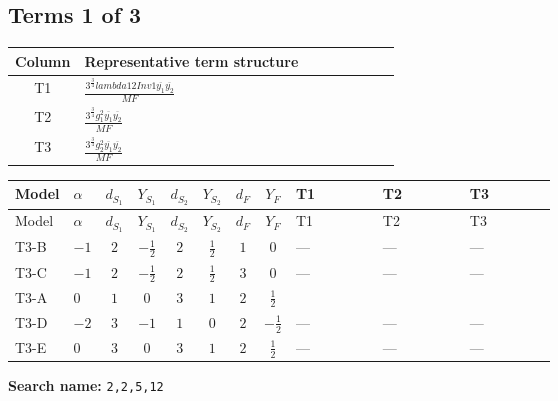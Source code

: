 \documentclass[8pt]{article}
\begin{document}
\begin{landscape}
\subsection*{Terms 1 of 3}
\begin{center}
\begin{tabular}{@{}c >{\raggedright\arraybackslash}p{0.82\linewidth}@{}}
\toprule
Column & Representative term structure \\
\midrule
T1 & \(\displaystyle \frac{3^{\frac{3}{4}} lambda12Inv1 \overline{y_{1}} \overline{y_{2}}}{MF}\) \\
\midrule
T2 & \(\displaystyle \frac{3^{\frac{3}{4}} g_{1}^{2} \overline{y_{1}} \overline{y_{2}}}{MF}\) \\
\midrule
T3 & \(\displaystyle \frac{3^{\frac{3}{4}} g_{2}^{2} \overline{y_{1}} \overline{y_{2}}}{MF}\) \\
\midrule
\bottomrule
\end{tabular}
\end{center}
\smallskip
\tiny
\begin{longtable}{@{}llcccccc >{\raggedright\arraybackslash}p{0.21\linewidth} >{\raggedright\arraybackslash}p{0.21\linewidth} >{\raggedright\arraybackslash}p{0.21\linewidth}@{}}
\toprule
Model & $\alpha$ & $d_{S_1}$ & $Y_{S_1}$ & $d_{S_2}$ & $Y_{S_2}$ & $d_F$ & $Y_F$ & T1 & T2 & T3 \\
\midrule
\endfirsthead
\toprule
Model & $\alpha$ & $d_{S_1}$ & $Y_{S_1}$ & $d_{S_2}$ & $Y_{S_2}$ & $d_F$ & $Y_F$ & T1 & T2 & T3 \\
\midrule
\endhead
T3-B & $-1$ & $2$ & $-\frac{1}{2}$ & $2$ & $\frac{1}{2}$ & $1$ & $0$ & --- & --- & --- \\
\midrule
T3-C & $-1$ & $2$ & $-\frac{1}{2}$ & $2$ & $\frac{1}{2}$ & $3$ & $0$ & --- & --- & --- \\
\midrule
T3-A & $0$ & $1$ & $0$ & $3$ & $1$ & $2$ & $\frac{1}{2}$ & \scriptsize\adjustbox{max width=\linewidth}{$\begin{gathered} \frac{3^{\frac{3}{4}} lambda12Inv1 \overline{y_{1}} \overline{y_{2}}}{6 MF}\end{gathered}$} & \scriptsize\adjustbox{max width=\linewidth}{$\begin{gathered} \frac{3^{\frac{3}{4}} g_{1}^{2} \overline{y_{1}} \overline{y_{2}}}{8 MF}\end{gathered}$} & \scriptsize\adjustbox{max width=\linewidth}{$\begin{gathered} \frac{11 \cdot 3^{\frac{3}{4}} g_{2}^{2} \overline{y_{1}} \overline{y_{2}}}{8 MF}\end{gathered}$} \\
\midrule
T3-D & $-2$ & $3$ & $-1$ & $1$ & $0$ & $2$ & $-\frac{1}{2}$ & --- & --- & --- \\
\midrule
T3-E & $0$ & $3$ & $0$ & $3$ & $1$ & $2$ & $\frac{1}{2}$ & --- & --- & --- \\
\midrule
\bottomrule
\end{longtable}
\clearpage
\noindent\textbf{Search name: }\texttt{2,2,5,12}\par\smallskip

\end{landscape}
\end{document}
